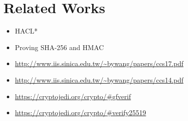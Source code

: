 \section{Related Works}

\begin{itemize}
  \item HACL*
  \item Proving SHA-256 and HMAC
  \item \url{http://www.iis.sinica.edu.tw/~bywang/papers/ccs17.pdf}
  \item \url{http://www.iis.sinica.edu.tw/~bywang/papers/ccs14.pdf}
  \item \url{https://cryptojedi.org/crypto/#gfverif}
  \item \url{https://cryptojedi.org/crypto/#verify25519}
\end{itemize}
